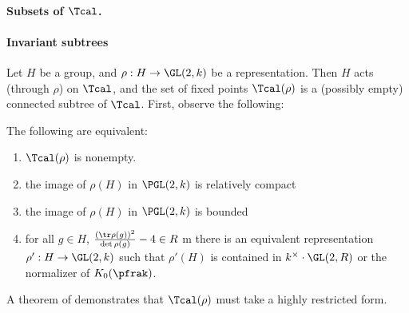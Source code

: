 \documentclass[draft]{amsart}
\begin{document}
\paragraph*{Subsets of $\Tcal$.}




\paragraph*{Invariant subtrees}
Let $H$ be a group, and $\rho: H \to \GL(2,k)$ be a representation. Then $H$ acts (through $\rho$) on $\Tcal$, and the set of fixed points $\Tcal(\rho)$ is a (possibly empty) connected subtree of $\Tcal$. First, observe the following:
\begin{proposition}
    The following are equivalent:
    \begin{enumerate}
        \item $\Tcal(\rho)$ is nonempty.
        \item the image of $\rho(H)$ in $\PGL(2,k)$ is relatively compact
        \item the image of $\rho(H)$ in $\PGL(2,k)$ is bounded
        \item for all $g\in H$,  $\frac{(\tr\rho(g))^2}{\det \rho (g)}-4 \in R$
              \ite m there is an equivalent representation $\rho': H \to \GL(2,k)$ such that $\rho'(H)$ is contained in $k^\times\cdot \GL(2,R)$ or the normalizer of $K_0(\pfrak)$.
    \end{enumerate}
\end{proposition}



A theorem of \cite{bellaicheSousgroupesGLArbres2014} demonstrates that $\Tcal(\rho)$ must take a highly restricted form.
\begin{proposition}

\end{proposition}

\end{document}
